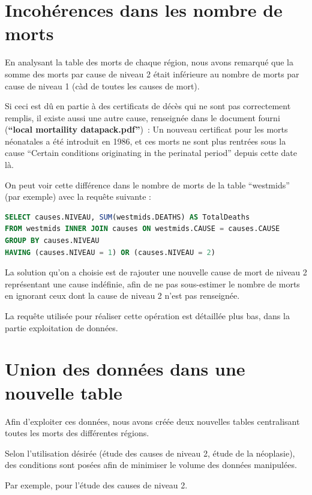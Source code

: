 \section{Incohérences dans les nombre de morts}

    En analysant la table des morts de chaque région, nous avons remarqué que la somme des morts par cause de niveau 2 était
    inférieure au nombre de morts par cause de niveau 1 (càd de toutes les causes de mort).

    Si ceci est dû en partie à des certificats de décès qui ne sont pas correctement remplis, il existe aussi une autre cause,
    renseignée dans le document fourni (\textbf{``local mortaility datapack.pdf''})~: Un nouveau certificat pour les morts néonatales
    a été introduit en 1986, et ces morts ne sont plus rentrées sous la cause ``Certain conditions originating in the perinatal
    period'' depuis cette date là.

    On peut voir cette différence dans le nombre de morts de la table ``westmids'' (par exemple) avec la requête suivante :

    \begin{lstlisting}[frame=single, language=SQL]
SELECT causes.NIVEAU, SUM(westmids.DEATHS) AS TotalDeaths
FROM westmids INNER JOIN causes ON westmids.CAUSE = causes.CAUSE
GROUP BY causes.NIVEAU
HAVING (causes.NIVEAU = 1) OR (causes.NIVEAU = 2)
    \end{lstlisting}

    La solution qu'on a choisie est de rajouter une nouvelle cause de mort de niveau 2 représentant une cause indéfinie, afin
    de ne pas sous-estimer le nombre de morts en ignorant ceux dont la cause de niveau 2 n'est pas renseignée.

    La requête utilisée pour réaliser cette opération est détaillée plus bas, dans la partie exploitation de données.

\section{Union des données dans une nouvelle table}

    Afin d'exploiter ces données, nous avons créée deux nouvelles tables centralisant toutes les morts des différentes régions.

    Selon l'utilisation désirée (étude des causes de niveau 2, étude de la néoplasie), des conditions sont posées afin
    de minimiser le volume des données manipulées.

    Par exemple, pour l'étude des causes de niveau 2.

